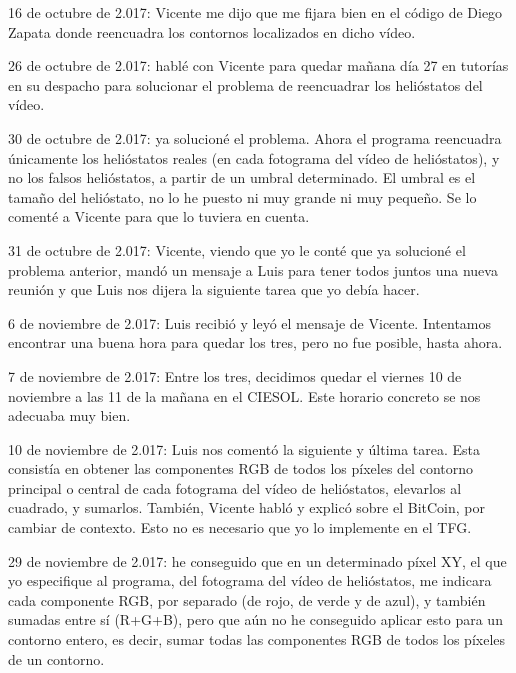 \documentclass[12pt]{article}
\begin{document}
16 de octubre de 2.017: Vicente me dijo que me fijara bien en el código de Diego Zapata donde reencuadra los contornos localizados en dicho vídeo.

26 de octubre de 2.017: hablé con Vicente para quedar mañana día 27 en tutorías en su despacho para solucionar el problema de reencuadrar los helióstatos del vídeo.

30 de octubre de 2.017: ya solucioné el problema. Ahora el programa reencuadra únicamente los helióstatos reales (en cada fotograma del vídeo de helióstatos), y no los falsos helióstatos, a partir de un umbral determinado. El umbral es el tamaño del helióstato, no lo he puesto ni muy grande ni muy pequeño. Se lo comenté a Vicente para que lo tuviera en cuenta.

31 de octubre de 2.017: Vicente, viendo que yo le conté que ya solucioné el problema anterior, mandó un mensaje a Luis para tener todos juntos una nueva reunión y que Luis nos dijera la siguiente tarea que yo debía hacer.

6 de noviembre de 2.017: Luis recibió y leyó el mensaje de Vicente. Intentamos encontrar una buena hora para quedar los tres, pero no fue posible, hasta ahora.

7 de noviembre de 2.017: Entre los tres, decidimos quedar el viernes 10 de noviembre a las 11 de la mañana en el CIESOL. Este horario concreto se nos adecuaba muy bien.

10 de noviembre de 2.017: Luis nos comentó la siguiente y última tarea. Esta consistía en obtener las componentes RGB de todos los píxeles del contorno principal o central de cada fotograma del vídeo de helióstatos, elevarlos al cuadrado, y sumarlos. También, Vicente habló y explicó sobre el BitCoin, por cambiar de contexto. Esto no es necesario que yo lo implemente en el TFG.

29 de noviembre de 2.017: he conseguido que en un determinado píxel XY, el que yo especifique al programa, del fotograma del vídeo de helióstatos, me indicara cada componente RGB, por separado (de rojo, de verde y de azul), y también sumadas entre sí (R+G+B), pero que aún no he conseguido aplicar esto para un contorno entero, es decir, sumar todas las componentes RGB de todos los píxeles de un contorno.
\end{document}
